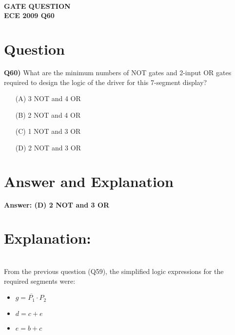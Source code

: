 \documentclass[12pt]{article}
\begin{document}
\vspace{5em}
\begin{center}
    {\LARGE \textbf{\textcolor{darkskyblue}{\\  GATE QUESTION \\ ECE 2009 Q60}}}
\end{center}   
\vspace{1em}
{\color{violet}\section*{Question}}
\textbf{Q60)} What are the minimum numbers of NOT gates and 2-input OR gates required to design the logic of the driver for this 7-segment display?

\vspace{1em}
\begin{itemize}
    \item[(A)] 3 NOT and 4 OR
    \item[(B)] 2 NOT and 4 OR
    \item[(C)] 1 NOT and 3 OR
    \item[(D)] 2 NOT and 3 OR
\end{itemize}

\vspace{1em}


\vspace{1em}
{\color{violet}\section*{Answer and Explanation}}

\textbf{Answer: (D) 2 NOT and 3 OR}
\vspace{2em}
\section*{Explanation:}\\
From the previous question (Q59), the simplified logic expressions for the required segments were:
\begin{itemize}
    \item $g = \overline{P_1} \cdot P_2$
    \item $d = c + e$
    \item $e = b + c$
\end{itemize}
\end{document}

